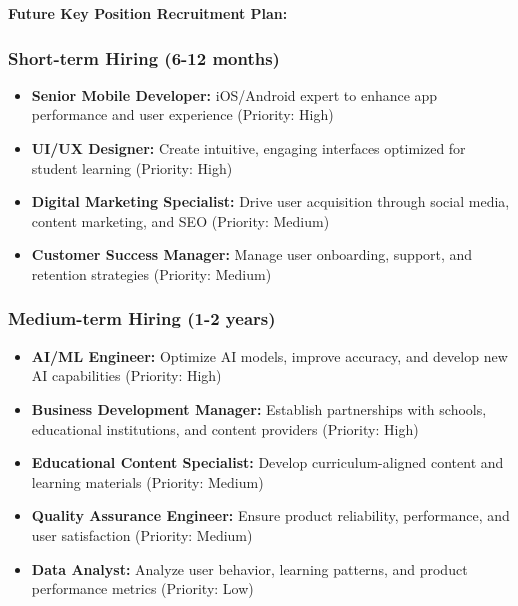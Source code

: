 \textbf{Future Key Position Recruitment Plan:}

\subsubsection{Short-term Hiring (6-12 months)}
\begin{itemize}
    \item \textbf{Senior Mobile Developer:} iOS/Android expert to enhance app performance and user experience (Priority: High)
    \item \textbf{UI/UX Designer:} Create intuitive, engaging interfaces optimized for student learning (Priority: High)
    \item \textbf{Digital Marketing Specialist:} Drive user acquisition through social media, content marketing, and SEO (Priority: Medium)
    \item \textbf{Customer Success Manager:} Manage user onboarding, support, and retention strategies (Priority: Medium)
\end{itemize}

\subsubsection{Medium-term Hiring (1-2 years)}
\begin{itemize}
    \item \textbf{AI/ML Engineer:} Optimize AI models, improve accuracy, and develop new AI capabilities (Priority: High)
    \item \textbf{Business Development Manager:} Establish partnerships with schools, educational institutions, and content providers (Priority: High)
    \item \textbf{Educational Content Specialist:} Develop curriculum-aligned content and learning materials (Priority: Medium)
    \item \textbf{Quality Assurance Engineer:} Ensure product reliability, performance, and user satisfaction (Priority: Medium)
    \item \textbf{Data Analyst:} Analyze user behavior, learning patterns, and product performance metrics (Priority: Low)
\end{itemize}

